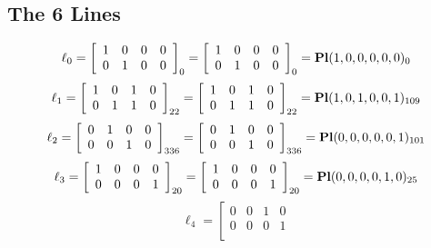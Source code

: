 \documentclass{article}
\begin{document}
{\subsection*{The 6 Lines}
$$
\ell_{0} = 
\left[
\begin{array}{*{4}{r}}
1 & 0 & 0 & 0\\
0 & 1 & 0 & 0\\
\end{array}
\right]
_{0}
=
\left[
\begin{array}{*{4}c}
1  & 0  & 0  & 0\\
0  & 1  & 0  & 0\\
\end{array}
\right]_{0}
={\rm\bf Pl}(1,0,0,0,0,0 )_{0}$$
$$
\ell_{1} = 
\left[
\begin{array}{*{4}{r}}
1 & 0 & 1 & 0\\
0 & 1 & 1 & 0\\
\end{array}
\right]
_{22}
=
\left[
\begin{array}{*{4}c}
1  & 0  & 1  & 0\\
0  & 1  & 1  & 0\\
\end{array}
\right]_{22}
={\rm\bf Pl}(1,0,1,0,0,1 )_{109}$$
$$
\ell_{2} = 
\left[
\begin{array}{*{4}{r}}
0 & 1 & 0 & 0\\
0 & 0 & 1 & 0\\
\end{array}
\right]
_{336}
=
\left[
\begin{array}{*{4}c}
0  & 1  & 0  & 0\\
0  & 0  & 1  & 0\\
\end{array}
\right]_{336}
={\rm\bf Pl}(0,0,0,0,0,1 )_{101}$$
$$
\ell_{3} = 
\left[
\begin{array}{*{4}{r}}
1 & 0 & 0 & 0\\
0 & 0 & 0 & 1\\
\end{array}
\right]
_{20}
=
\left[
\begin{array}{*{4}c}
1  & 0  & 0  & 0\\
0  & 0  & 0  & 1\\
\end{array}
\right]_{20}
={\rm\bf Pl}(0,0,0,0,1,0 )_{25}$$
$$
\ell_{4} = 
\left[
\begin{array}{*{4}{r}}
0 & 0 & 1 & 0\\
0 & 0 & 0 & 1\\
\end{array}
$$}
\end{document}
